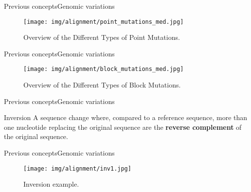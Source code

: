 \documentclass[10pt]{beamer}
\newcommand{\1}{
	\setbeamertemplate{background}{
		\texttt{[image: img/1]}
		\tikz[overlay] \fill[fill opacity=0.75,fill=white] (0,0) rectangle (-\paperwidth,\paperheight);
	}
}
\begin{document}
\begin{frame}{Previous concepts}{Genomic variations}
	\begin{figure}[]
		\centering
		\texttt{[image: img/alignment/point\_mutations\_med.jpg]}
		\label{img:alig}
		\caption{Overview of the Different Types of Point Mutations.}
	\end{figure}
\end{frame}

\begin{frame}{Previous concepts}{Genomic variations}
	\begin{figure}[]
		\centering
		\texttt{[image: img/alignment/block\_mutations\_med.jpg]}
		\label{img:alig}
		\caption{Overview of the Different Types of Block Mutations.}
	\end{figure}
\end{frame}

\begin{frame}{Previous concepts}{Genomic variations}
\begin{block}{Inversion}
	A sequence change where, compared to a reference sequence, more than one nucleotide replacing the original sequence are the \textbf{reverse complement} of the original sequence.	
\end{block}
\end{frame}

\begin{frame}{Previous concepts}{Genomic variations}
	\begin{figure}[]
		\centering
		\texttt{[image: img/alignment/inv1.jpg]}
		\label{img:alig}
		\caption{Inversion example.}
	\end{figure}
\end{frame}
\end{document}
